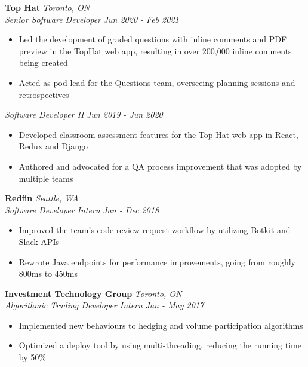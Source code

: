 \documentclass[a4paper,11pt]{article}
\begin{document}
\textbf{Top Hat} \hspace*{\fill} \emph{Toronto, ON} \\
\emph{Senior Software Developer} \hspace*{\fill} \emph{Jun 2020 - Feb 2021}
\vspace{1.5pt}
\begin{itemize}[noitemsep, topsep=-1ex]
\item Led the development of graded questions with inline comments and PDF preview in the TopHat web app, resulting in over 200,000 inline comments being created
\item Acted as pod lead for the Questions team, overseeing planning sessions and retrospectives
\end{itemize}
\vspace{1.5pt}
\emph{Software Developer II} \hspace*{\fill} \emph{Jun 2019 - Jun 2020}
\vspace{1.5pt}
\begin{itemize}[noitemsep, topsep=-1ex]
\item Developed classroom assessment features for the Top Hat web app in React, Redux and Django
\item Authored and advocated for a QA process improvement that was adopted by multiple teams
\end{itemize}
\vspace{1.5pt}
 \textbf{Redfin} \hspace*{\fill}  \emph{Seattle, WA}  \\
\emph{Software Developer Intern} \hspace*{\fill}  \emph{Jan - Dec 2018}
\vspace{1.5pt}
\begin{itemize}[noitemsep, topsep=-1ex]
\item Improved the team's code review request workflow by utilizing Botkit and Slack APIs
\item Rewrote Java endpoints for performance improvements, going from roughly 800ms to 450ms
\end{itemize}
\vspace{1.5pt}
\textbf{Investment Technology Group} \hspace*{\fill} \emph{Toronto, ON} \\
 \emph{Algorithmic Trading Developer Intern}  \hspace*{\fill} \emph{Jan - May 2017} 
 \vspace{1.5pt}
\begin{itemize}[noitemsep, topsep=-1ex]
\item Implemented new behaviours to hedging and volume participation algorithms
\item Optimized a deploy tool by using multi-threading, reducing the running time by 50\%
\end{itemize}
  
\end{document}
